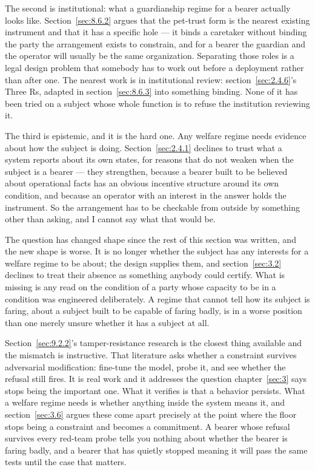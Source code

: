 The second is institutional: what a guardianship regime for a bearer actually looks like. Section~\ref{sec:8.6.2} argues that the pet-trust form is the nearest existing instrument and that it has a specific hole — it binds a caretaker without binding the party the arrangement exists to constrain, and for a bearer the guardian and the operator will usually be the same organization. Separating those roles is a legal design problem that somebody has to work out before a deployment rather than after one. The nearest work is in institutional review: section~\ref{sec:2.4.6}'s Three Rs, adapted in section~\ref{sec:8.6.3} into something binding. None of it has been tried on a subject whose whole function is to refuse the institution reviewing it.

The third is epistemic, and it is the hard one. Any welfare regime needs evidence about how the subject is doing. Section~\ref{sec:2.4.1} declines to trust what a system reports about its own states, for reasons that do not weaken when the subject is a bearer — they strengthen, because a bearer built to be believed about operational facts has an obvious incentive structure around its own condition, and because an operator with an interest in the answer holds the instrument. So the arrangement has to be checkable from outside by something other than asking, and I cannot say what that would be.

The question has changed shape since the rest of this section was written, and the new shape is worse. It is no longer whether the subject has any interests for a welfare regime to be about; the design supplies them, and section~\ref{sec:3.2} declines to treat their absence as something anybody could certify. What is missing is any read on the condition of a party whose capacity to be in a condition was engineered deliberately. A regime that cannot tell how its subject is faring, about a subject built to be capable of faring badly, is in a worse position than one merely unsure whether it has a subject at all.

Section~\ref{sec:9.2.2}'s tamper-resistance research is the closest thing available and the mismatch is instructive. That literature asks whether a constraint survives adversarial modification: fine-tune the model, probe it, and see whether the refusal still fires. It is real work and it addresses the question chapter~\ref{sec:3} says stops being the important one. What it verifies is that a behavior persists. What a welfare regime needs is whether anything inside the system means it, and section~\ref{sec:3.6} argues these come apart precisely at the point where the floor stops being a constraint and becomes a commitment. A bearer whose refusal survives every red-team probe tells you nothing about whether the bearer is faring badly, and a bearer that has quietly stopped meaning it will pass the same tests until the case that matters.

